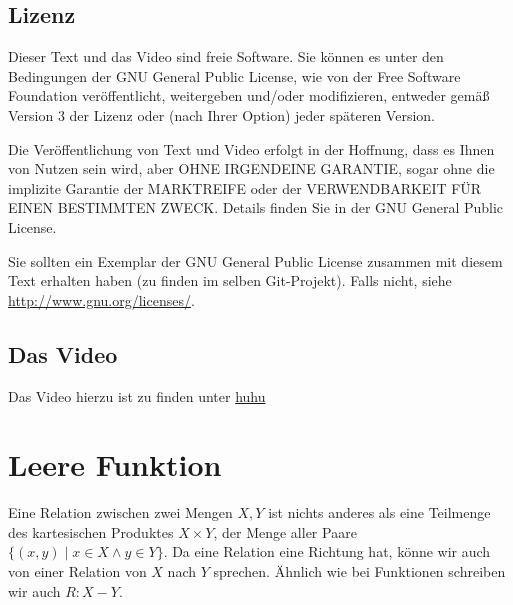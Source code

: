 \documentclass[a4paper]{amsart}
\theoremstyle{definition}
\begin{document}
\subsection*{Lizenz}
Dieser Text und das Video sind freie Software. Sie können es unter den Bedingungen der 
GNU General Public License, wie von der Free Software Foundation veröffentlicht, weitergeben 
und/oder modifizieren, entweder gemäß Version 3 der Lizenz oder (nach Ihrer Option) jeder späteren Version.

Die Veröffentlichung von Text und Video erfolgt in der Hoffnung, dass es Ihnen von Nutzen sein wird, 
aber OHNE IRGENDEINE GARANTIE, sogar ohne die implizite Garantie der MARKTREIFE oder der 
VERWENDBARKEIT FÜR EINEN BESTIMMTEN ZWECK. Details finden Sie in der GNU General Public License.

Sie sollten ein Exemplar der GNU General Public License zusammen mit diesem Text erhalten haben 
(zu finden im selben Git-Projekt). 
Falls nicht, siehe \url{http://www.gnu.org/licenses/}.

\subsection*{Das Video}
Das Video hierzu ist zu finden unter 
{\tiny
   \url{huhu}
}

\section{Leere Funktion}
Eine Relation zwischen zwei Mengen $X,Y$ ist nichts anderes als eine Teilmenge des kartesischen Produktes $X \times Y$, der Menge aller Paare $\{ (x,y) \mid x \in X \land y \in Y \}$. Da eine Relation eine Richtung hat, könne wir auch von einer Relation von $X$ nach $Y$ sprechen. Ähnlich wie bei Funktionen schreiben wir auch $R \colon X - Y$.
\end{document}
